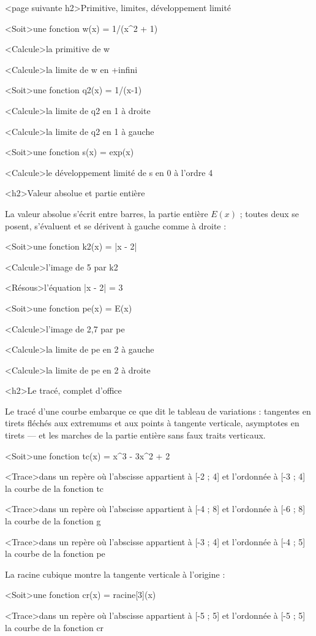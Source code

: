 \documentclass[marges=20, taille=11, precision=3]{texecole}
\begin{document}
<page suivante h2>Primitive, limites, développement limité

<Soit>une fonction w(x) = 1/(x^2 + 1)

<Calcule>la primitive de w

<Calcule>la limite de w en +infini

<Soit>une fonction q2(x) = 1/(x-1)

<Calcule>la limite de q2 en 1 à droite

<Calcule>la limite de q2 en 1 à gauche

<Soit>une fonction s(x) = exp(x)

<Calcule>le développement limité de s en 0 à l'ordre 4

<h2>Valeur absolue et partie entière

La valeur absolue s'écrit entre barres, la partie entière $E(x)$ ; toutes deux se posent, s'évaluent et se dérivent à gauche comme à droite :

<Soit>une fonction k2(x) = |x - 2|

<Calcule>l'image de 5 par k2

<Résous>l'équation |x - 2| = 3

<Soit>une fonction pe(x) = E(x)

<Calcule>l'image de 2,7 par pe

<Calcule>la limite de pe en 2 à gauche

<Calcule>la limite de pe en 2 à droite

<h2>Le tracé, complet d'office

Le tracé d'une courbe embarque ce que dit le tableau de variations : tangentes en tirets fléchés aux extremums et aux points à tangente verticale, asymptotes en tirets — et les marches de la partie entière sans faux traits verticaux.

<Soit>une fonction tc(x) = x^3 - 3x^2 + 2

<Trace>dans un repère où l'abscisse appartient à [-2 ; 4] et l'ordonnée à [-3 ; 4] {
	la courbe de la fonction tc
}

<Trace>dans un repère où l'abscisse appartient à [-4 ; 8] et l'ordonnée à [-6 ; 8] {
	la courbe de la fonction g
}

<Trace>dans un repère où l'abscisse appartient à [-3 ; 4] et l'ordonnée à [-4 ; 5] {
	la courbe de la fonction pe
}

La racine cubique montre la tangente verticale à l'origine :

<Soit>une fonction cr(x) = racine[3](x)

<Trace>dans un repère où l'abscisse appartient à [-5 ; 5] et l'ordonnée à [-5 ; 5] {
	la courbe de la fonction cr
}
\end{document}
